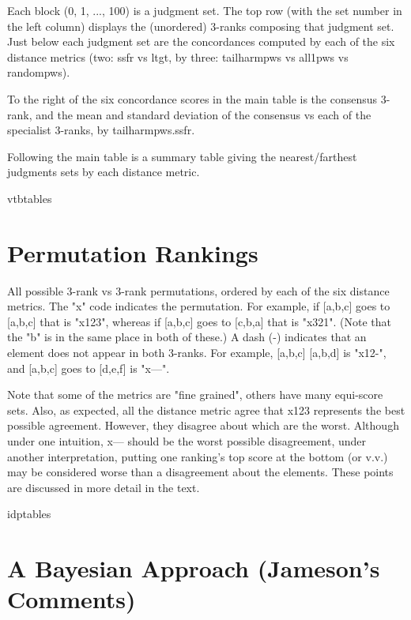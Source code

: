 \documentclass{article}
\begin{document}
Each block (0, 1, ..., 100) is a judgment set. The top row (with the set number in the left column) displays the (unordered) 3-ranks composing that judgment set. Just below each judgment set are the concordances computed by each of the six distance metrics (two: ssfr vs ltgt, by three: tailharmpws vs all1pws vs randompws). 

To the right of the six concordance scores in the main table is the consensus 3-rank, and the mean and standard deviation of the consensus vs each of the specialist 3-ranks, by tailharmpws.ssfr.  

Following the main table is a summary table giving the nearest/farthest judgments sets by each distance metric. 

{vtbtables}

\newpage

\section{Permutation Rankings}

All possible 3-rank vs 3-rank permutations, ordered by each of the six distance metrics. The "x" code indicates the permutation. For example, if [a,b,c] goes to [a,b,c] that is "x123", whereas if  [a,b,c] goes to [c,b,a] that is "x321". (Note that the "b" is in the same place in both of these.) A dash (-) indicates that an element does not appear in both 3-ranks. For example, [a,b,c]  [a,b,d] is "x12-", and  [a,b,c] goes to [d,e,f] is "x---". 

Note that some of the metrics are "fine grained", others have many equi-score sets. Also, as expected, all the distance metric agree that x123 represents the best possible agreement. However, they disagree about which are the worst. Although under one intuition, x--- should be the worst possible disagreement, under another interpretation, putting one ranking's top score at the bottom (or v.v.) may be considered worse than a disagreement about the elements. These points are discussed in more detail in the text.

{idptables}

\newpage

\section{A Bayesian Approach (Jameson's Comments)}
\end{document}
